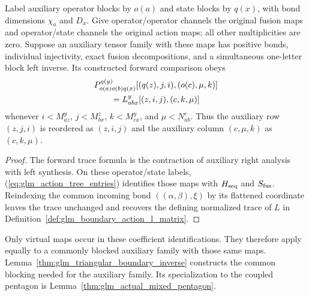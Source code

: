 \begin{lemma}
    \leanok
    \label{thm:glm_auxiliary_action_comparison}
    Label auxiliary operator blocks by $o(a)$ and state blocks by $q(x)$,
    with bond dimensions $\chi_a$ and $D_x$. Give operator/operator
    channels the original fusion maps and operator/state channels the
    original action maps; all other multiplicities are zero. Suppose
    an auxiliary tensor family with these maps has positive bonds,
    individual injectivity, exact fusion decompositions, and a simultaneous
    one-letter block left inverse. Its constructed forward comparison obeys
    \begin{align}
         & P_{o(a)o(b)q(x)}^{q(y)}
        [(q(z),j,i),(o(c),\mu,k)]\notag          \\
         & \qquad=L_{abx}^{y}[(z,i,j),(c,k,\mu)]
        \label{eq:glm_auxiliary_action_comparison}
    \end{align}
    whenever $i<M_{az}^{y}$, $j<M_{bx}^{z}$, $k<M_{cx}^{y}$, and
    $\mu<N_{ab}^{c}$. Thus the auxiliary row $(z,j,i)$ is reordered as
    $(z,i,j)$ and the auxiliary column $(c,\mu,k)$ as $(c,k,\mu)$.
\end{lemma}
\begin{proof}
    \leanok
    The forward trace formula is the contraction of auxiliary right
    analysis with left synthesis. On these operator/state labels,
    (\ref{eq:glm_action_tree_entries}) identifies those maps with
    $H_{\rm seq}$ and $S_{\rm fus}$. Reindexing the common incoming bond
    $((\alpha,\beta),\xi)$ by its flattened coordinate leaves the trace
    unchanged and recovers the defining normalized trace of $L$ in
    Definition~\ref{def:glm_boundary_action_l_matrix}.
\end{proof}

Only virtual maps occur in these coefficient identifications. They therefore
apply equally to a commonly blocked auxiliary family with those same maps.
Lemma~\ref{thm:glm_triangular_boundary_inverse} constructs the common
blocking needed for the auxiliary family. Its specialization to the
coupled pentagon is Lemma~\ref{thm:glm_actual_mixed_pentagon}.

